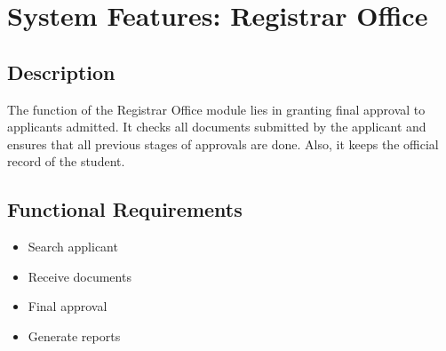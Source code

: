 \section{System Features: Registrar Office}

\subsection{Description}
The function of the Registrar Office module lies in granting final approval to applicants admitted. 
It checks all documents submitted by the applicant and ensures that all previous stages of approvals are done. 
Also, it keeps the official record of the student.

\subsection{Functional Requirements}

\begin{itemize}
    \item Search applicant
    \item Receive documents
    \item Final approval
    \item Generate reports
\end{itemize}